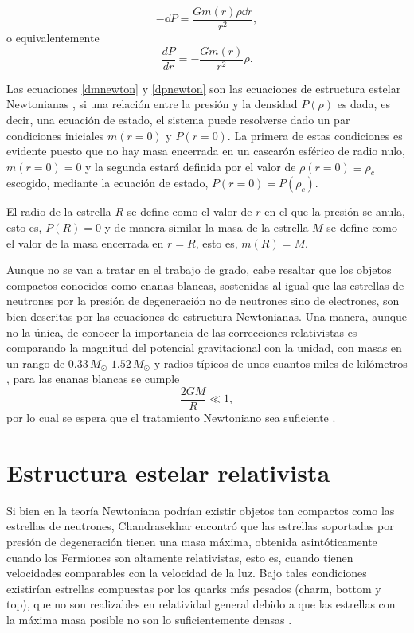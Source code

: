 \begin{equation}
    -\dd P =\frac{Gm(r)\rho\dd r}{r^2},
\end{equation}
o equivalentemente
\begin{equation}
    \frac { d P } { d r } = - \frac { G m ( r ) } { r ^ { 2 } } \rho.
    \label{dpnewton}
\end{equation}

Las ecuaciones \eqref{dmnewton} y \eqref{dpnewton} son las ecuaciones de estructura estelar Newtonianas \cite{Chandrasekhar1958AnStructure}, si una relación entre la presión y la densidad $P(\rho)$ es dada, es decir, una ecuación de estado, el sistema puede resolverse dado un par condiciones iniciales $m(r=0)$ y $P(r=0)$. La primera de estas condiciones es evidente puesto que no hay masa encerrada en un cascarón esférico de radio nulo, $m(r=0)=0$ y la segunda estará definida por el valor de $\rho(r=0)\equiv\rho_c$ escogido, mediante la ecuación de estado, $P(r=0)=P(\rho_c)$.

El radio de la estrella $R$ se define como el valor de $r$ en el que la presión se anula, esto es, $P(R)=0$ y de manera similar la masa de la estrella $M$ se define como el valor de la masa encerrada en $r=R$, esto es, $m(R)=M$.

Aunque no se van a tratar en el trabajo de grado, cabe resaltar que los objetos compactos conocidos como enanas blancas, sostenidas al igual que las estrellas de neutrones por la presión de degeneración no de neutrones sino de electrones, son bien descritas por las ecuaciones de estructura Newtonianas. Una manera, aunque no la única, de conocer la importancia de las correcciones relativistas es comparando la magnitud del potencial gravitacional con la unidad, con masas en un rango de $0.33\,M_{\odot}$ $1.52\,M_{\odot}$ y radios típicos de unos cuantos miles de kilómetros \cite{Glendenning2000CompactStars}, para las enanas blancas se cumple
\begin{equation}
    \frac{2GM}{R}\ll 1,
\end{equation}
por lo cual se espera que el tratamiento Newtoniano sea suficiente \cite{Weinberg1972GravitationCosmology}. 

\section{Estructura estelar relativista}
Si bien en la teoría Newtoniana podrían existir objetos tan compactos como las estrellas de neutrones, Chandrasekhar encontró que las estrellas soportadas por presión de degeneración tienen una masa máxima, obtenida asintóticamente cuando los Fermiones son altamente relativistas, esto es, cuando tienen velocidades comparables con la velocidad de la luz. Bajo tales condiciones existirían estrellas compuestas por los quarks más pesados (charm, bottom y top), que no son realizables en relatividad general debido a que las estrellas con la máxima masa posible no son lo suficientemente densas \cite{Glendenning2000CompactStars}.

